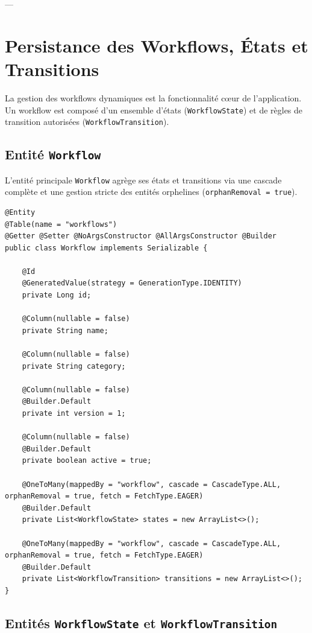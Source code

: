 \documentclass[11pt,a4paper]{article}
\begin{document}
---

\section{Persistance des Workflows, États et Transitions}

La gestion des workflows dynamiques est la fonctionnalité cœur de l'application. Un workflow est composé d'un ensemble d'états (\texttt{WorkflowState}) et de règles de transition autorisées (\texttt{WorkflowTransition}).

\subsection{Entité \texttt{Workflow}}

L'entité principale \texttt{Workflow} agrège ses états et transitions via une cascade complète et une gestion stricte des entités orphelines (\texttt{orphanRemoval = true}).

\begin{lstlisting}[language=CustomJava, caption={Entite Workflow et ses collections associees.}]
@Entity
@Table(name = "workflows")
@Getter @Setter @NoArgsConstructor @AllArgsConstructor @Builder
public class Workflow implements Serializable {

    @Id
    @GeneratedValue(strategy = GenerationType.IDENTITY)
    private Long id;

    @Column(nullable = false)
    private String name;

    @Column(nullable = false)
    private String category;

    @Column(nullable = false)
    @Builder.Default
    private int version = 1;

    @Column(nullable = false)
    @Builder.Default
    private boolean active = true;

    @OneToMany(mappedBy = "workflow", cascade = CascadeType.ALL, orphanRemoval = true, fetch = FetchType.EAGER)
    @Builder.Default
    private List<WorkflowState> states = new ArrayList<>();

    @OneToMany(mappedBy = "workflow", cascade = CascadeType.ALL, orphanRemoval = true, fetch = FetchType.EAGER)
    @Builder.Default
    private List<WorkflowTransition> transitions = new ArrayList<>();
}
\end{lstlisting}

\subsection{Entités \texttt{WorkflowState} et \texttt{WorkflowTransition}}
\end{document}
